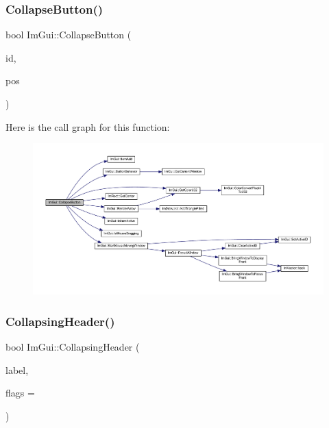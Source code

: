 \subsubsection{\texorpdfstring{Collapse\+Button()}{CollapseButton()}}
{\footnotesize\ttfamily bool Im\+Gui\+::\+Collapse\+Button (\begin{DoxyParamCaption}\item[{\mbox{\hyperlink{imgui_8h_a1785c9b6f4e16406764a85f32582236f}{Im\+Gui\+ID}}}]{id,  }\item[{const \mbox{\hyperlink{struct_im_vec2}{Im\+Vec2}} \&}]{pos }\end{DoxyParamCaption})}

Here is the call graph for this function\+:
\nopagebreak
\begin{figure}[H]
\begin{center}
\leavevmode
\includegraphics[width=350pt]{namespace_im_gui_acd027458d7a062d3d3073339454624e3_cgraph}
\end{center}
\end{figure}
\mbox{\label{namespace_im_gui_ab52f9e08698c9d64abb05b98f5355146}} 
\subsubsection{\texorpdfstring{Collapsing\+Header()}{CollapsingHeader()}\hspace{0.1cm}{\footnotesize\ttfamily [1/2]}}
{\footnotesize\ttfamily bool Im\+Gui\+::\+Collapsing\+Header (\begin{DoxyParamCaption}\item[{const char $\ast$}]{label,  }\item[{\mbox{\hyperlink{imgui_8h_a0588fdd10c59b49a0159484fe9ec4564}{Im\+Gui\+Tree\+Node\+Flags}}}]{flags = {} }\end{DoxyParamCaption})}

